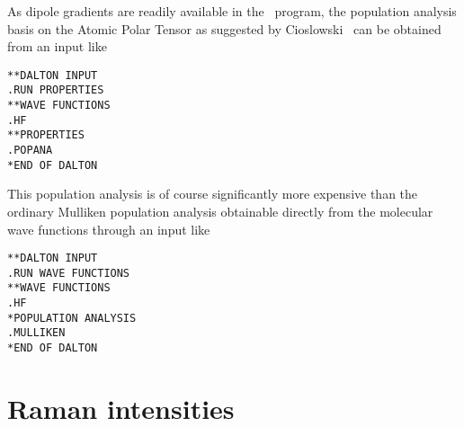 \begin{center}
\end{center}

 As dipole gradients are readily available in the
\siraba\ program, the
population analysis basis on the Atomic Polar Tensor as suggested by
Cioslowski~\cite{jcjacs111,poakrkvmthjpca102} can be obtained from an input like

\begin{verbatim}
**DALTON INPUT
.RUN PROPERTIES
**WAVE FUNCTIONS
.HF
**PROPERTIES
.POPANA
*END OF DALTON
\end{verbatim}

This population analysis is of course significantly more expensive
than the ordinary Mulliken population analysis obtainable directly
from the molecular wave functions through an input like

\begin{verbatim}
**DALTON INPUT
.RUN WAVE FUNCTIONS
**WAVE FUNCTIONS
.HF
*POPULATION ANALYSIS
.MULLIKEN
*END OF DALTON
\end{verbatim}


\section{Raman intensities}\label{sec:ramanint}

\begin{center}
\end{center}

